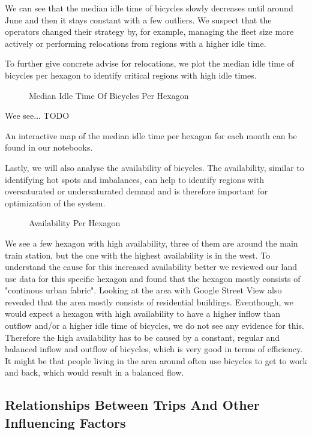 We can see that the median idle time of bicycles slowly decreases until around
June and then it stays constant with a few outliers. We suspect that the
operators changed their strategy by, for example, managing the fleet size more
actively or performing relocations from regions
with a higher idle time.

To further give concrete advise for relocations, we plot the median idle time
of bicycles per hexagon to identify critical regions with high idle times.

\begin{figure}[htb]
    \centering
    \caption{Median Idle Time Of Bicycles Per Hexagon}
    \label{fig:descriptive_analysis_idle_time_hexagon}
\end{figure}

Wee see... TODO


An interactive map of the median idle time per hexagon for each month can be
found in our notebooks.

Lastly, we will also analyse the availability of bicycles. The availability,
similar to identifying hot spots and imbalances, can help to identify regions
with oversaturated or undersaturated demand and is therefore important for
optimization of the system.


\begin{figure}[htb]
    \centering
    \caption{Availability Per Hexagon}
    \label{fig:descriptive_analysis_availability_per_hexagon}
\end{figure}

We see a few hexagon with high availability, three of them are around the main
train station, but the one with the highest availability is in the west. To
understand the cause for this increased availability better we reviewed our
land use data for this specific hexagon and found that the hexagon mostly
consists of "continous urban fabric". Looking at the area with Google Street
View also revealed that the area mostly consists of residential buildings.
Eventhough, we would expect a hexagon with high availability to have a higher
inflow than outflow and/or a higher idle time of bicycles, we do not see any
evidence for this. Therefore the high availability has to be caused by a constant,
regular and balanced inflow and outflow of bicycles, which is very good in
terms of efficiency. It might be that people living in the area around often
use bicycles to get to work and back, which would result in a balanced flow.


\subsection{Relationships Between Trips And Other Influencing Factors}
\label{subsec:descriptive_analysis_relationships}
